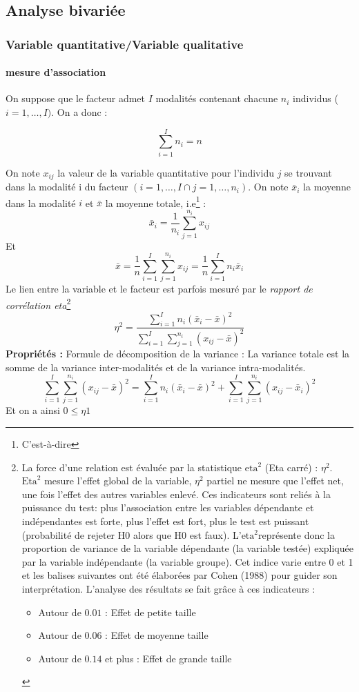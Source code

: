 \subsection{Analyse bivariée}
\subsubsection{Variable quantitative/Variable qualitative}
\paragraph{mesure d'association}
On suppose que le facteur admet $I$ modalités contenant chacune $n_{i}$ individus ($i = 1,\dots,I)$.\newline
On a donc :

$$\sum_{i=1}^{I} n_{i} = n$$

On note $x_{ij}$ la valeur de la variable quantitative pour l'individu $j$ se trouvant dans la modalité i du facteur $(i = 1,\dots,I \cap j =1,\dots,n_{i})$.\newline
On note $\bar{x}_{i}$ la moyenne dans la modalité $i$ et $\bar{x}$ la moyenne totale, i.e\footnote{C'est-à-dire} : 
$$\bar{x}_{i} = \frac{1}{n_{i}}\sum_{j=1}^{n_{i}} x_{ij}$$
Et 
$$\bar{x} = \frac{1}{n}\sum_{i=1}^{I}\sum_{j=1}^{n_{i}} x_{ij} = \frac{1}{n}\sum_{i=1}^{I}n_{i}\bar{x}_{i}$$
Le lien entre la variable et le facteur est parfois mesuré par le \textit{rapport de corrélation eta}\footnote{La force d'une relation est évaluée par la statistique $\textrm{eta}^{2}$ (Eta carré) : $\eta^{2}$.\newline
$\textrm{Eta}^{2}$ mesure l'effet global de la variable, $\eta^{2}$ partiel ne mesure que l'effet net, une fois l'effet des autres variables enlevé. Ces indicateurs sont reliés à la puissance du test: plus l'association entre les variables dépendante et indépendantes est forte, plus l'effet est fort, plus le test est puissant (probabilité de rejeter H0 alors que H0 est faux).\newline
L'$\textrm{eta}^{2}$représente donc la proportion de variance de la variable dépendante (la variable testée) expliquée par la variable indépendante (la variable groupe). Cet indice varie entre 0 et 1 et les balises suivantes ont été élaborées par Cohen (1988) pour guider son interprétation. L'analyse des résultats se fait grâce à ces indicateurs :
\begin{itemize}
\item Autour de $0.01$ : Effet de petite taille 
\item Autour de $0.06$ : Effet de moyenne taille 
\item Autour de $0.14$ et plus : Effet de grande taille
\end{itemize}
} 
$$\eta^{2} = \frac{\sum_{i=1}^{I} n_{i} (\bar{x}_{i}-\bar{x})^{2}}{\sum_{i=1}^{I}\sum_{j=1}^{n_{i}}(x_{ij}-\bar{x})^{2}}$$
\textbf{Propriétés : } Formule de décomposition de la variance : La variance totale est la somme de la variance inter-modalités et de la variance intra-modalités.
$$\sum_{i=1}^{I}\sum_{j=1}^{n_{i}} (x_{ij}-\bar{x})^{2} = \sum_{i=1}^{I}n_{i}(\bar{x}_{i} - \bar{x})^{2} + \sum_{i=1}^{I}\sum_{j=1}^{n_{i}} (x_{ij}-\bar{x}_{i})^{2}$$
Et on a ainsi $0\leq \eta 1$
